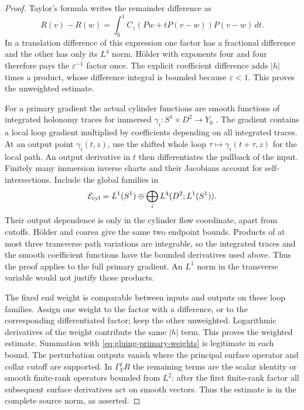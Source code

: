 \documentclass[11pt]{amsart}
\theoremstyle{definition}
\theoremstyle{remark}
\theoremstyle{plain}
\begin{document}
\begin{proof}
Taylor's formula writes the remainder difference as
\[
 R(v)-R(w)=\int_0^1 C_z(Pw+tP(v-w))P(v-w)\,dt.
\]
In a translation difference of this expression one factor has a
fractional difference and the other has only its $L^4$ norm.
H\"older with exponents four and four therefore pays the
$\varepsilon^{-1}$ factor once. The explicit coefficient difference
adds $|h|$ times a product, whose difference integral is bounded
because $\varepsilon<1$. This proves the unweighted estimate.

For a primary gradient the actual cylinder functions are smooth
functions of integrated holonomy traces for immersed
$\gamma_i:S^1\times D^2\to Y_0$
\cite[Section~6.1]{DaeFukLip21a}. The gradient contains a local
loop gradient multiplied by coefficients depending on all integrated
traces. At an output point $\gamma_i(t,z)$, use the shifted whole
loop $\tau\mapsto\gamma_i(t+\tau,z)$ for the local path.
An output derivative in $t$ then differentiates the pullback of the
input. Finitely many immersion inverse charts and their Jacobians
account for self-intersections. Include the global families in
\[
 \mathcal E_{\rm cyl}=L^1(S^1)\oplus
                         \bigoplus_i L^4(D^2;L^1(S^1)).
\]
Their output dependence is only in the cylinder flow coordinate,
apart from cutoffs. H\"older and coarea give the same two endpoint
bounds. Products of at most three transverse path variations are
integrable, so the integrated traces and the smooth coefficient
functions have the bounded derivatives used above. Thus the proof
applies to the full primary gradient. An $L^1$ norm in the
transverse variable would not justify those products.

The fixed end weight is comparable between inputs and outputs on
these loop families. Assign one weight to the factor with a difference,
or to the corresponding differentiated factor; keep the other
unweighted. Logarithmic derivatives of the weight contribute the same
$|h|$ term. This proves the weighted estimate. Summation with
\eqref{eq:gluing-primary-weights} is legitimate in each bound.
The perturbation outputs vanish where the principal surface operator
and collar cutoff are supported. In $\Gamma_Y^jR$ the remaining
terms are the scalar identity or smooth finite-rank operators bounded
from $L^2$: after the first finite-rank factor all subsequent surface
derivatives act on smooth vectors. Thus the estimate is in the
complete source norm, as asserted.


\end{proof}
\end{document}
